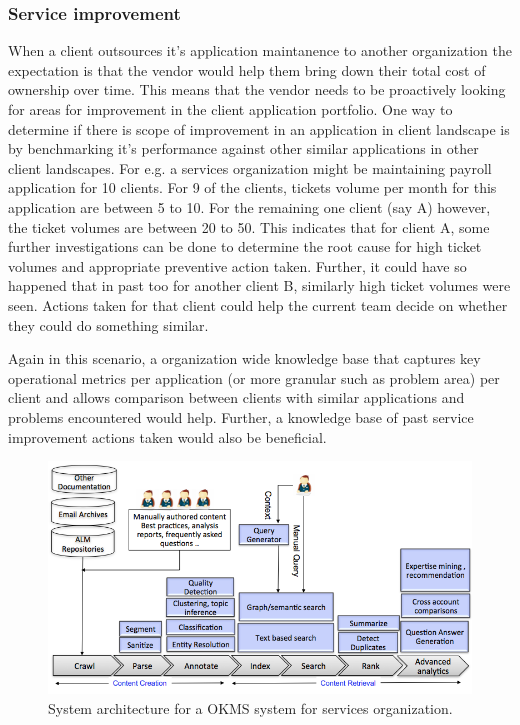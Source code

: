 \subsubsection{Service improvement}

When a client outsources it's application maintanence to another organization the expectation is that the vendor would help them bring down their total cost of ownership over time. This means that the vendor needs to be proactively looking for areas for improvement in the client application portfolio. One way to determine if there is scope of improvement in an application in client landscape is by benchmarking it's performance against other similar applications in other client landscapes. For e.g. a services organization might be maintaining payroll application for 10 clients. For 9 of the clients, tickets volume per month for this application are between 5 to 10. For the remaining one client (say A) however, the ticket volumes are between 20 to 50. This indicates that for client A, some further investigations can be done to determine the root cause for high ticket volumes and appropriate preventive action taken. Further, it could have so happened that in past too for another client B, similarly high ticket volumes were seen. Actions taken for that client could help the current team decide on whether they could do something similar.

Again in this scenario, a organization wide knowledge base that captures key operational metrics per application (or more granular such as problem area) per client and allows comparison between clients with similar applications and problems encountered would help. Further, a knowledge base of past service improvement actions taken would also be beneficial.

\begin{figure}
	\center
	\includegraphics[scale=0.5]{figs/km.png}
	\caption{System architecture for a OKMS system for services organization.}
	\label{fig-km}
\end{figure}


